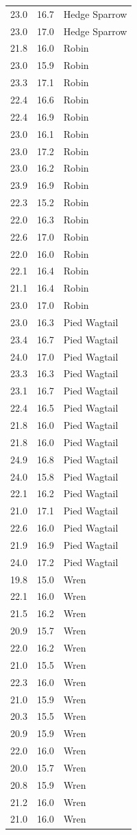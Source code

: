 \documentclass[
  letterpaper,
  DIV=11,
  numbers=noendperiod]{scrartcl}
\begin{document}
{\begin{longtable}[]{@{}rrl@{}}
23.0 & 16.7 & Hedge Sparrow \\
23.0 & 17.0 & Hedge Sparrow \\
21.8 & 16.0 & Robin \\
23.0 & 15.9 & Robin \\
23.3 & 17.1 & Robin \\
22.4 & 16.6 & Robin \\
22.4 & 16.9 & Robin \\
23.0 & 16.1 & Robin \\
23.0 & 17.2 & Robin \\
23.0 & 16.2 & Robin \\
23.9 & 16.9 & Robin \\
22.3 & 15.2 & Robin \\
22.0 & 16.3 & Robin \\
22.6 & 17.0 & Robin \\
22.0 & 16.0 & Robin \\
22.1 & 16.4 & Robin \\
21.1 & 16.4 & Robin \\
23.0 & 17.0 & Robin \\
23.0 & 16.3 & Pied Wagtail \\
23.4 & 16.7 & Pied Wagtail \\
24.0 & 17.0 & Pied Wagtail \\
23.3 & 16.3 & Pied Wagtail \\
23.1 & 16.7 & Pied Wagtail \\
22.4 & 16.5 & Pied Wagtail \\
21.8 & 16.0 & Pied Wagtail \\
21.8 & 16.0 & Pied Wagtail \\
24.9 & 16.8 & Pied Wagtail \\
24.0 & 15.8 & Pied Wagtail \\
22.1 & 16.2 & Pied Wagtail \\
21.0 & 17.1 & Pied Wagtail \\
22.6 & 16.0 & Pied Wagtail \\
21.9 & 16.9 & Pied Wagtail \\
24.0 & 17.2 & Pied Wagtail \\
19.8 & 15.0 & Wren \\
22.1 & 16.0 & Wren \\
21.5 & 16.2 & Wren \\
20.9 & 15.7 & Wren \\
22.0 & 16.2 & Wren \\
21.0 & 15.5 & Wren \\
22.3 & 16.0 & Wren \\
21.0 & 15.9 & Wren \\
20.3 & 15.5 & Wren \\
20.9 & 15.9 & Wren \\
22.0 & 16.0 & Wren \\
20.0 & 15.7 & Wren \\
20.8 & 15.9 & Wren \\
21.2 & 16.0 & Wren \\
21.0 & 16.0 & Wren \\
\end{longtable}
}
\end{document}
